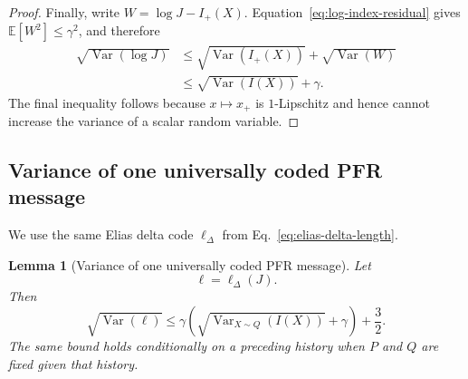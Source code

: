 \documentclass{article}
\theoremstyle{plain}
\newtheorem{lemma}[theorem]{Lemma}
\theoremstyle{definition}
\theoremstyle{remark}
\begin{document}
\begin{proof}
Finally, write $W=\log J-I_+(X)$. Equation~\eqref{eq:log-index-residual} gives $\mathbb E[W^2]\leq\gamma^2$, and therefore
\begin{align}
    \sqrt{\operatorname{Var}(\log J)}
    &\leq
    \sqrt{\operatorname{Var}(I_+(X))}
    +
    \sqrt{\operatorname{Var}(W)}
    \\
    &\leq
    \sqrt{\operatorname{Var}(I(X))}
    +\gamma.
\end{align}
The final inequality follows because $x\mapsto x_+$ is $1$-Lipschitz and hence cannot increase the variance of a scalar random variable.
\end{proof}

\subsection{Variance of one universally coded PFR message}

We use the same Elias delta code $\ell_\Delta$ from Eq.~\eqref{eq:elias-delta-length}.
\begin{lemma}[Variance of one universally coded PFR message]
\label{lem:pfr-message-variance}
Let
\begin{equation}
    \ell
    =
    \ell_\Delta(J).
\end{equation}
Then
\begin{equation}
    \sqrt{\operatorname{Var}(\ell)}
    \leq
    \gamma\left(
      \sqrt{\operatorname{Var}_{X\sim Q}(I(X))}
      +\gamma
    \right)
    +\frac{3}{2}.
    \label{eq:single-message-variance}
\end{equation}
The same bound holds conditionally on a preceding history when $P$ and $Q$ are fixed given that history.
\end{lemma}
\end{document}
